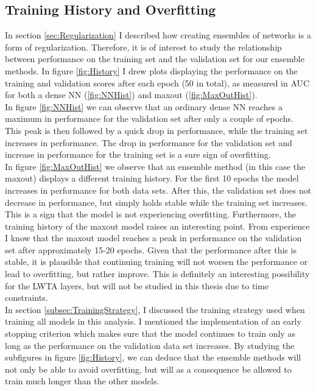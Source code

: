 \subsection{Training History and Overfitting}\label{subsec:Overfitting}
In section \ref{sec:Regularization} I described how creating ensembles of networks is a form of regularization. Therefore,
it is of interest to study the relationship between performance on the training set and the validation set for our ensemble 
methods. In figure \ref{fig:History} I drew plots displaying the performance on the training and validation scores after each 
epoch (50 in total), as measured in \ac{AUC} for both a dense \ac{NN} (\ref{fig:NNHist}) and maxout (\ref{fig:MaxOutHist}).
\\ 
In figure \ref{fig:NNHist} we can observe that an ordinary dense \ac{NN} reaches a maximum in performance for the validation set after only 
a couple of epochs. This peak is then followed by a quick drop in performance, while the training set increases in performance. 
The drop in performance for the validation set and increase in performance for the training set is a sure sign of overfitting. 
\\
In figure \ref{fig:MaxOutHist} we observe that an ensemble method (in this case the maxout) displays a different training history. For the first 
10 epochs the model increases in performance for both data sets. After this, the validation set does not decrease in performance, but 
simply holds stable while the training set increases. This is a sign that the model is not experiencing overfitting. Furthermore, the 
training history of the maxout model raises an interesting point. From experience I know that the maxout model reaches a peak in performance
on the validation set after approximately 15-20 epochs. Given that the performance after this is stable, it is plausible that continuing 
training will not worsen the performance or lead to overfitting, but rather improve. This is definitely an interesting possibility
for the \ac{LWTA} layers, but will not be studied in this thesis due to time constraints.
\\
In section \ref{subsec:TrainingStrategy}, I discussed the training strategy used when training all models in this analysis. I mentioned 
the implementation of an early stopping criterion which makes sure that the model continues to train only as long as the performance on the 
validation data set increases. By studying the subfigures in figure \ref{fig:History}, we can deduce that the ensemble methods will not only 
be able to avoid overfitting, but will as a consequence be allowed to train much longer than the other models.

